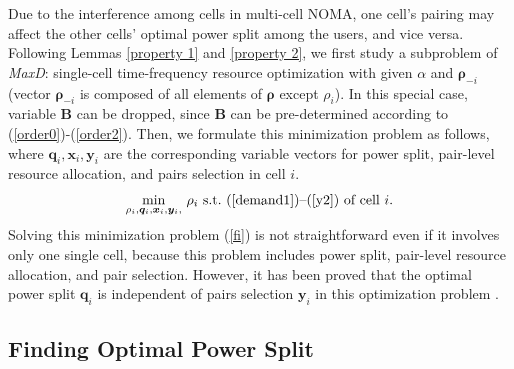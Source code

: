 \documentclass[10pt,journal,final,finalsubmission,twocolumn]{IEEEtran}
\begin{document}
Due to the interference among cells in multi-cell NOMA, one cell's pairing may affect the other cells' optimal power split among the users, and vice versa. Following Lemmas \ref{property 1} and \ref{property 2}, we first study a subproblem of {\em MaxD}: single-cell time-frequency resource optimization with given $\alpha$ and $\boldsymbol{\rho}_{-i}$ (vector $\boldsymbol{\rho}_{-i}$ is composed of all elements of $\boldsymbol{\rho}$ except $\rho_i$). In this special case, variable $\boldsymbol{B}$ can be dropped, since $\boldsymbol{B}$ can be pre-determined according to (\ref{order0})-(\ref{order2}). Then, we formulate this minimization problem as follows, where $\boldsymbol{q}_i,\boldsymbol{x}_i,\boldsymbol{y}_i$ are the corresponding variable vectors for power split, pair-level resource allocation, and pairs selection in cell $i$.
\begin{equation}\label{fi}
 \underset{\rho_i, \boldsymbol{q}_i,\boldsymbol{x}_i,\boldsymbol{y}_i,}{\min} \  \rho_i \ \textup{s.t.\ (\ref{demand1})--(\ref{y2}) of cell $i$} .
\end{equation}
Solving this minimization problem (\ref{fi}) is not straightforward even if it involves only one single cell, because this problem includes power split,  pair-level resource allocation, and pair selection. However, it has been proved that the optimal power split $\boldsymbol{q}_i$ is independent of pairs selection $\boldsymbol{y}_i$ in this optimization problem \cite[Theorem 1]{You1}.



\subsection{Finding Optimal Power Split}\label{OptimalPowerSplit}
\end{document}
